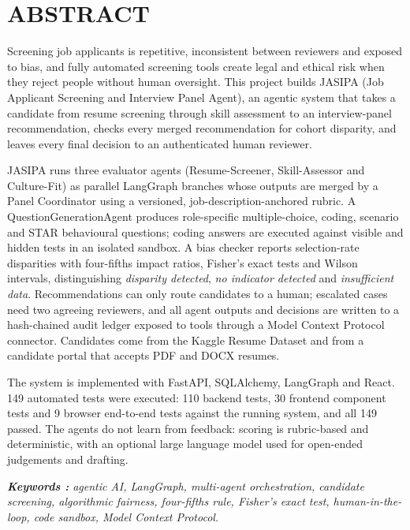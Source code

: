\chapter*{ABSTRACT}%
\begin{justify}

Screening job applicants is repetitive, inconsistent between reviewers and exposed to bias, and fully automated screening tools create legal and ethical risk when they reject people without human oversight. This project builds JASIPA (Job Applicant Screening and Interview Panel Agent), an agentic system that takes a candidate from resume screening through skill assessment to an interview-panel recommendation, checks every merged recommendation for cohort disparity, and leaves every final decision to an authenticated human reviewer.

JASIPA runs three evaluator agents (Resume-Screener, Skill-Assessor and Culture-Fit) as parallel LangGraph branches whose outputs are merged by a Panel Coordinator using a versioned, job-description-anchored rubric. A QuestionGenerationAgent produces role-specific multiple-choice, coding, scenario and STAR behavioural questions; coding answers are executed against visible and hidden tests in an isolated sandbox. A bias checker reports selection-rate disparities with four-fifths impact ratios, Fisher's exact tests and Wilson intervals, distinguishing \emph{disparity detected}, \emph{no indicator detected} and \emph{insufficient data}. Recommendations can only route candidates to a human; escalated cases need two agreeing reviewers, and all agent outputs and decisions are written to a hash-chained audit ledger exposed to tools through a Model Context Protocol connector. Candidates come from the Kaggle Resume Dataset and from a candidate portal that accepts PDF and DOCX resumes.

The system is implemented with FastAPI, SQLAlchemy, LangGraph and React. 149 automated tests were executed: 110 backend tests, 30 frontend component tests and 9 browser end-to-end tests against the running system, and all 149 passed. The agents do not learn from feedback: scoring is rubric-based and deterministic, with an optional large language model used for open-ended judgements and drafting.
\end{justify}

\begin{flushleft}
\vspace{1cm}
\textsl {\textbf {Keywords :} agentic AI, LangGraph, multi-agent orchestration, candidate screening, algorithmic fairness, four-fifths rule, Fisher's exact test, human-in-the-loop, code sandbox, Model Context Protocol.}
\end{flushleft}
